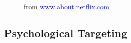 \documentclass[aspectratio=169]{beamer}
\begin{document}
\begin{frame}
{\begin{figure}
            \caption{from \href{https://about.netflix.com/pl/company-assets}{\textcolor{blue}{www.about.netflix.com}}}
        \end{figure}
    }

\end{frame}

\subsection[Facebook Studies]{Psychological Targeting}
\end{document}
